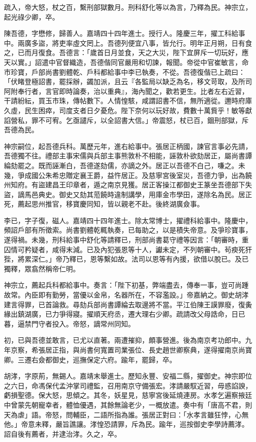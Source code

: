 \begin{pinyinscope}
{{疏入，帝大怒，杖之百，繫刑部獄數月。刑科舒化等以為言，乃釋為民。神宗立，起光祿少卿，卒。

陳吾德，字懋修，歸善人。嘉靖四十四年進士。授行人。隆慶三年，擢工科給事中。兩廣多盜，將吏率虛文罔上。吾德列便宜八事，皆允行。明年正月朔，日有食之，已而月復食。吾德言：「歲首日月並食，天之大災，陛下宜屏斥一切玩好，應天以實。」詔遣中官督織造，吾德偕同官嚴用和切諫，報聞。帝從中官崔敏言，命市珍寶，戶部尚書劉體乾、戶科都給事中李已執奏，不從。吾德復偕已上疏曰：「伏睹登極詔書，罷採辦，蠲加派，且云『各監局以缺乏為名，移文苛取，及所司阿附奉行者，言官即時論奏，治以重典』，海內聞之，歡若更生。比者左右近習，干請紛紜，買玉市珠，傳帖數下。人情惶駭，咸謂詔書不信，無所適從。邇時府庫久虛，民生困瘁，司度支者日夕憂危。陛下奈何以玩好故，費數十萬貲乎！敏等獻諂營私，罪不可宥。乞亟譴斥，以全詔書大信。」帝震怒，杖已百，錮刑部獄，斥吾德為民。

神宗嗣位，起吾德兵科。萬歷元年，進右給事中。張居正柄國，諫官言事必先請，吾德獨不往。禮部主事宋儒與兵部主事熊敦朴不相能，誣敦朴欲劾居正，屬尚書譚綸劾罷之。既而誣漸白，吾德遂劾儒，亦謫之外。居正以吾德不白己，嗛之。未幾，爭成國公朱希忠贈定襄王爵，益忤居正。及慈寧宮後室災，吾德力爭，出為饒州知府。有盜建昌王印章者，遁之南京見獲。居正客操江都御史王篆坐吾德部下失盜，謫馬邑典史。御史又劾其蒞饒時違制講學，用庫金市學田，遂除名為民。居正死，薦起思州推官，移寶慶同知，皆以親老不赴。後終湖廣僉事。

李已，字子復，磁人。嘉靖四十四年進士。除太常博士，擢禮科給事中。隆慶中，頻詔戶部有所徵索。尚書劉體乾輒執奏，已每助之，以是積失帝意。及爭珍寶事，遂得禍。未幾，刑科給事中舒化等請釋已，刑部尚書葛守禮等因言：「朝審時，重囚情可矜疑者，咸得末減。已及內犯張恩等十人，讞未定，不列朝審中。茍瘐死犴狴，將累深仁。」帝乃釋已，恩等繫如故。法司以恩等有內援，欲借以脫已。及已獨釋，眾翕然稱帝仁明。

神宗立，薦起兵科都給事中。奏言：「陛下初基，弊端盡去，傳奉一事，豈可尚踵故常。內臣即有勤勞，當優以金帛，名器所在，不容濫設。」帝嘉納之。御史胡涍建言得罪，已首論救。尋劾兵部尚書譚綸去取邊將不當。平江伯陳王謨罪廢，復夤緣出鎮湖廣，已力爭得寢。擢順天府丞，遷大理右少卿。疏請改父母誥命，日已暮，逼禁門守者投入。帝怒，謫常州同知。

初，已與吾德並敢言，已尤以直著。兩遭摧抑，頗事營進。後為南京考功郎中。九年京察，希張居正指，與尚書何寬置司業張位、長史趙世卿察典，遂得擢南京尚寶卿。三遷右僉都御史，巡撫保定六府。踰年，罷歸，卒。

胡涍，字原荊，無錫人。嘉靖末舉進士。歷知永豐、安福二縣，擢御史。神宗即位之六日，命馮保代孟沖掌司禮監，召用南京守備張宏。涍請嚴馭近習，毋惑諂諛，虧損聖德。保大怒，思傾之。其冬，妖星見，慈寧宮後延燒連房。水孝乞遍察掖廷中曾蒙先朝寵幸者，體恤優遇，其餘無論老少，一概放遣。奏中有「唐高不君，則天為虐」語。帝怒，問輔臣，二語所指為誰。張居正對曰：「水孝言雖狂悖，心無他。」帝意未釋，嚴旨譙讓。涍惶恐請罪，斥為民。踰年，巡按御史李學詩薦涍。詔自後有薦者，并逮治涍。久之，卒。

}}
\end{pinyinscope}
